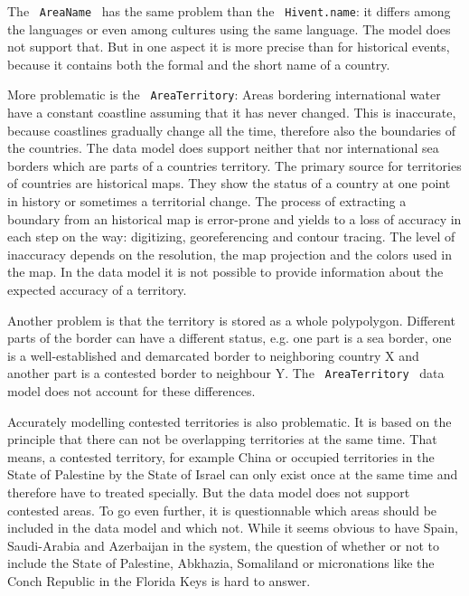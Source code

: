 The ~\texttt{AreaName}~ has the same problem than the ~\texttt{Hivent.name}: it differs among the languages or even among cultures using the same language. The model does not support that. But in one aspect it is more precise than for historical events, because it contains both the formal and the short name of a country.

More problematic is the ~\texttt{AreaTerritory}: Areas bordering international water have a constant coastline assuming that it has never changed. This is inaccurate, because coastlines gradually change all the time, therefore also the boundaries of the countries. The data model does support neither that nor international sea borders which are parts of a countries territory. The primary source for territories of countries are historical maps. They show the status of a country at one point in history or sometimes a territorial change. The process of extracting a boundary from an historical map is error-prone and yields to a loss of accuracy in each step on the way: digitizing, georeferencing and contour tracing. The level of inaccuracy depends on the resolution, the map projection and the colors used in the map. In the data model it is not possible to provide information about the expected accuracy of a territory.

Another problem is that the territory is stored as a whole polypolygon. Different parts of the border can have a different status, e.g. one part is a sea border, one is a well-established and demarcated border to neighboring country X and another part is a contested border to neighbour Y. The ~\texttt{AreaTerritory}~ data model does not account for these differences.

Accurately modelling contested territories is also problematic. It is based on the principle that there can not be overlapping territories at the same time. That means, a contested territory, for example China or occupied territories in the State of Palestine by the State of Israel can only exist once at the same time and therefore have to treated specially. But the data model does not support contested areas. To go even further, it is questionnable which areas should be included in the data model and which not. While it seems obvious to have Spain, Saudi-Arabia and Azerbaijan in the system, the question of whether or not to include the State of Palestine, Abkhazia, Somaliland or micronations like the Conch Republic in the Florida Keys is hard to answer.



